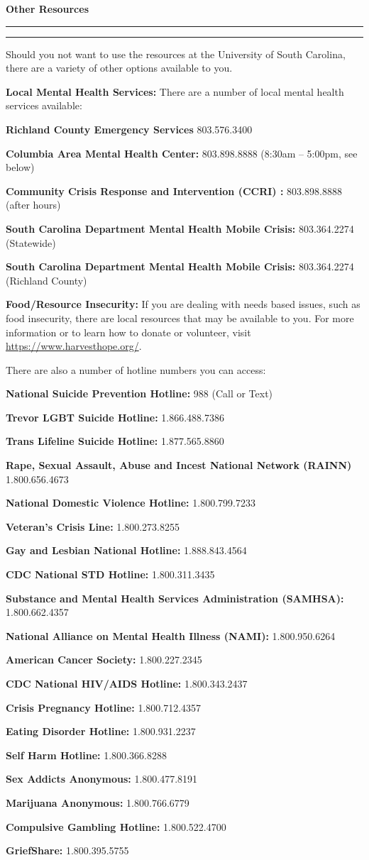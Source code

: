 \documentclass[11pt,letterpaper]{article}
\newcommand{\mysection}[2]{%
\begin{minipage}{\textwidth}
\phantomsection
	{%
\large\bfseries\color{scred}
#2 \par\vspace{-0.62\baselineskip}
\noindent\rule{#1\textwidth}{1.5pt} \par
\vspace{-0.3cm}\noindent\rule{0.13\textwidth}{5.1pt}%
	}%
\end{minipage}\par\vspace{4\lineskip}%
}
\newcommand{\colortext}[1]{{\bfseries\color{scred}#1}}
\newcommand{\ptspace}{\par\vspace{0.2\baselineskip}}
\newcommand{\pttspace}{\par\vspace{0.4\baselineskip}}
\newcommand{\pspecial}{\par\vspace{0.3\baselineskip}}
\begin{document}
\mysection{0.30}{Other Resources}

Should you not want to use the resources at the University of South Carolina, there are a variety of other options available to you. \pttspace

\colortext{Local Mental Health Services:} There are a number of local mental health services available: \ptspace
	\hspace{0.2cm} {\bfseries Richland County Emergency Services} 803.576.3400 \par
	\hspace{0.2cm} {\bfseries Columbia Area Mental Health Center:} 803.898.8888 (8:30am -- 5:00pm, see below) \par
	\hspace{0.2cm} {\bfseries Community Crisis Response and Intervention (CCRI) :} 803.898.8888 (after hours) \par
	\hspace{0.2cm} {\bfseries South Carolina Department Mental Health Mobile Crisis:} 803.364.2274 (Statewide) \par
	\hspace{0.2cm} {\bfseries South Carolina Department Mental Health Mobile Crisis:} 803.364.2274 (Richland County) \pspecial

\colortext{Food/Resource Insecurity:} If you are dealing with needs based issues, such as food insecurity, there are local resources that may be available to you. For more information or to learn how to donate or volunteer, visit \url{https://www.harvesthope.org/}. \par\vspace{0.3cm}


There are also a number of hotline numbers you can access: \pttspace

\colortext{National Suicide Prevention Hotline:} 988 (Call or Text) \pttspace
\colortext{Trevor LGBT Suicide Hotline:} 1.866.488.7386 \pttspace
\colortext{Trans Lifeline Suicide Hotline:} 1.877.565.8860 \pttspace
\colortext{Rape, Sexual Assault, Abuse and Incest National Network (RAINN)} 1.800.656.4673 \pttspace
\colortext{National Domestic Violence Hotline:} 1.800.799.7233 \pttspace
\colortext{Veteran's Crisis Line:} 1.800.273.8255 \pttspace
\colortext{Gay and Lesbian National Hotline:} 1.888.843.4564 \pttspace
\colortext{CDC National STD Hotline:} 1.800.311.3435 \pttspace
\colortext{Substance and Mental Health Services Administration (SAMHSA):} 1.800.662.4357 \pttspace
\colortext{National Alliance on Mental Health Illness (NAMI):} 1.800.950.6264 \pttspace
\colortext{American Cancer Society:} 1.800.227.2345 \pttspace
\colortext{CDC National HIV/AIDS Hotline:} 1.800.343.2437 \pttspace
\colortext{Crisis Pregnancy Hotline:} 1.800.712.4357 \pttspace
\colortext{Eating Disorder Hotline:} 1.800.931.2237 \pttspace
\colortext{Self Harm Hotline:} 1.800.366.8288 \pttspace
\colortext{Sex Addicts Anonymous:} 1.800.477.8191 \pttspace
\colortext{Marijuana Anonymous:} 1.800.766.6779 \pttspace
\colortext{Compulsive Gambling Hotline:} 1.800.522.4700 \pttspace
\colortext{GriefShare:} 1.800.395.5755
\end{document}
